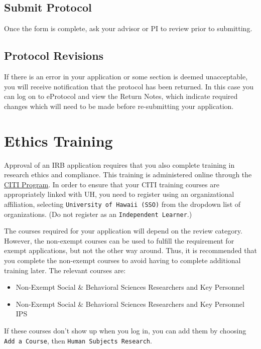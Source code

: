 \documentclass[
]{book}
\providecommand{\tightlist}{%
  \setlength{\itemsep}{0pt}\setlength{\parskip}{0pt}}
\begin{document}
\subsection{Submit Protocol}\label{submit-protocol}

Once the form is complete, ask your advisor or PI to review prior to submitting.

\subsection{Protocol Revisions}\label{protocol-revisions}

If there is an error in your application or some section is deemed unacceptable, you will receive notification that the protocol has been returned. In this case you can log on to eProtocol and view the Return Notes, which indicate required changes which will need to be made before re-submitting your application.

\section{Ethics Training}\label{ethics-training}

Approval of an IRB application requires that you also complete training in research ethics and compliance. This training is administered online through the \href{https://about.citiprogram.org}{CITI Program}. In order to ensure that your CITI training courses are appropriately linked with UH, you need to register using an organizational affiliation, selecting \texttt{University\ of\ Hawaii\ (SSO)} from the dropdown list of organizations. (Do not register as an \texttt{Independent\ Learner}.)

The courses required for your application will depend on the review category. However, the non-exempt courses can be used to fulfill the requirement for exempt applications, but not the other way around. Thus, it is recommended that you complete the non-exempt courses to avoid having to complete additional training later. The relevant courses are:

\begin{itemize}
\tightlist
\item
  Non-Exempt Social \& Behavioral Sciences Researchers and Key Personnel
\item
  Non-Exempt Social \& Behavioral Sciences Researchers and Key Personnel IPS
\end{itemize}

If these courses don't show up when you log in, you can add them by choosing \texttt{Add\ a\ Course}, then \texttt{Human\ Subjects\ Research}.
\end{document}
